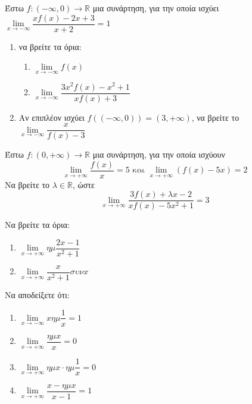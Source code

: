 \documentclass{presentation}
\begin{document}
\begin{askisi}
  Έστω $f:(-\infty,0)\to\mathbb{R}$ μια συνάρτηση, για την οποία ισχύει $\lim\limits_{x \to -\infty}{ \dfrac{xf(x)-2x+3}{x+2}  }=1$
  \begin{enumerate}
    \item να βρείτε τα όρια:
          \begin{enumerate}
            \item $\lim\limits_{x \to -\infty}{ f(x) }$ \pause
            \item $\lim\limits_{x \to -\infty}{ \dfrac{3x^2f(x)-x^2+1}{xf(x)+3}  }$
          \end{enumerate}
    \item Αν επιπλέον ισχύει $f\left( (-\infty,0) \right)=(3,+\infty) $, να βρείτε το $\lim\limits_{x \to -\infty}{ \dfrac{x}{f(x)-3} }$
  \end{enumerate}
\end{askisi}

\begin{askisi}
  Έστω $f:(0,+\infty)\to\mathbb{R}$ μια συνάρτηση, για την οποία ισχύουν
  $$\lim\limits_{x \to +\infty}{ \dfrac{f(x)}{x} }=5 \text{ και } \lim\limits_{x \to +\infty}{ (f(x)-5x) }=2$$
  Να βρείτε το $λ\in\mathbb{R}$, ώστε
  $$\lim\limits_{x \to +\infty}{ \dfrac{3f(x)+λx-2}{xf(x)-5x^2+1} }=3$$
\end{askisi}

\begin{askisi}
  Να βρείτε τα όρια:
  \begin{enumerate}
    \item $\lim\limits_{x \to +\infty}{ ημ\dfrac{2x-1}{x^2+1} }$ \pause
    \item $\lim\limits_{x \to +\infty}{ \dfrac{x}{x^2+1}συνx  }$
  \end{enumerate}
\end{askisi}

\begin{askisi}
  Να αποδείξετε ότι:
  \begin{enumerate}
    \item $\lim\limits_{x \to -\infty}{ xημ\dfrac{1}{x} }=1$ \pause
    \item $\lim\limits_{x \to +\infty}{ \dfrac{ημx}{x}  }=0$  \pause
    \item $\lim\limits_{x \to +\infty}{ ημx\cdot ημ\dfrac{1}{x}  }=0$  \pause
    \item $\lim\limits_{x \to +\infty}{ \dfrac{x-ημx}{x-1}  }=1$
  \end{enumerate}
\end{askisi}
\end{document}
